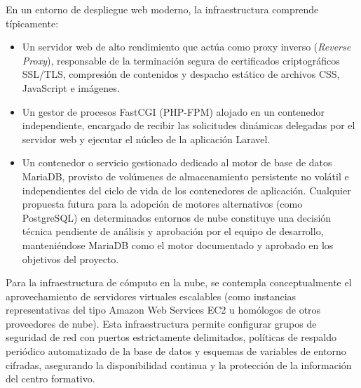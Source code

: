 En un entorno de despliegue web moderno, la infraestructura comprende típicamente:

\begin{itemize}
    \item Un servidor web de alto rendimiento que actúa como proxy inverso (\textit{Reverse Proxy}), responsable de la terminación segura de certificados criptográficos SSL/TLS, compresión de contenidos y despacho estático de archivos CSS, JavaScript e imágenes.
    \item Un gestor de procesos FastCGI (PHP-FPM) alojado en un contenedor independiente, encargado de recibir las solicitudes dinámicas delegadas por el servidor web y ejecutar el núcleo de la aplicación Laravel.
    \item Un contenedor o servicio gestionado dedicado al motor de base de datos MariaDB, provisto de volúmenes de almacenamiento persistente no volátil e independientes del ciclo de vida de los contenedores de aplicación. Cualquier propuesta futura para la adopción de motores alternativos (como PostgreSQL) en determinados entornos de nube constituye una decisión técnica pendiente de análisis y aprobación por el equipo de desarrollo, manteniéndose MariaDB como el motor documentado y aprobado en los objetivos del proyecto.
\end{itemize}

Para la infraestructura de cómputo en la nube, se contempla conceptualmente el aprovechamiento de servidores virtuales escalables (como instancias representativas del tipo Amazon Web Services EC2 u homólogos de otros proveedores de nube). Esta infraestructura permite configurar grupos de seguridad de red con puertos estrictamente delimitados, políticas de respaldo periódico automatizado de la base de datos y esquemas de variables de entorno cifradas, asegurando la disponibilidad continua y la protección de la información del centro formativo.
